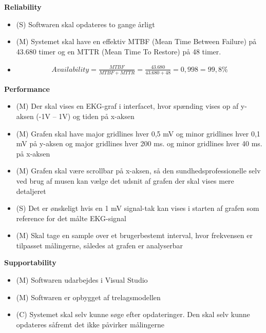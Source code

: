 \textbf{Reliability}
\begin{itemize}
	\item (S) Softwaren skal opdateres to gange årligt
	\item (M) Systemet skal have en effektiv MTBF (Mean Time Between Failure) på 43.680 timer og en MTTR (Mean Time To Restore) på 48 timer.
	\item  
				\begin{align}
					Availability = \frac{MTBF}{MTBF+MTTR} = \frac{43.680}{43.680+48} = 0,998 = 99,8 \%
				\end{align}

\end{itemize}

\textbf{Performance}
\begin{itemize}
	\item (M) Der skal vises en EKG-graf i interfacet, hvor spænding vises op af y-aksen (-1V – 1V) og tiden på x-aksen
	\item (M) Grafen skal have major gridlines hver 0,5 mV og minor gridlines hver 0,1 mV på y-aksen og major gridlines hver 200 ms. og minor gridlines hver 40 ms. på x-aksen
	\item (M) Grafen skal være scrollbar på x-aksen, så den sundhedsprofessionelle selv ved brug af musen kan vælge det udsnit af grafen der skal vises mere detaljeret
	\item (S) Det er ønskeligt hvis en 1 mV signal-tak kan vises i starten af grafen som reference for det målte EKG-signal
	\item (M) Skal tage en sample over et brugerbestemt interval, hvor frekvensen  er tilpasset målingerne, således at grafen er analyserbar
\end{itemize}

\textbf{Supportability}
\begin{itemize}
	\item (M) Softwaren udarbejdes i Visual Studio
	\item (M) Softwaren er opbygget af trelagsmodellen
	\item (C) Systemet skal selv kunne søge efter opdateringer. Den skal selv kunne opdateres såfremt det ikke påvirker målingerne
\end{itemize}















